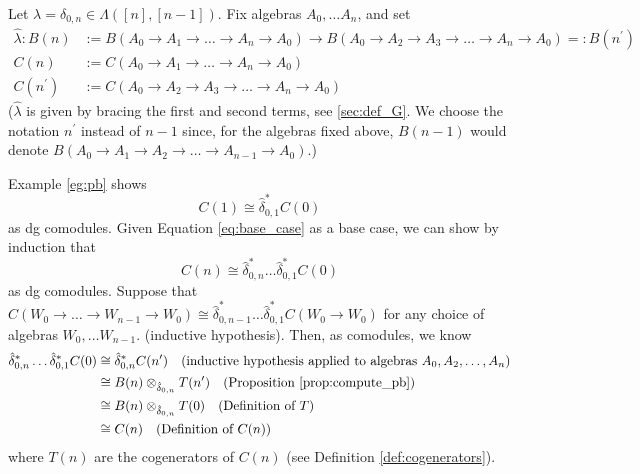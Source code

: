 %
\begin{eg} 
  \label{eg:pb2}
Let $\lambda = \delta_{0,n} \in 
\Lambda([n],[n-1])$. Fix algebras 
$A_0, \dots A_n$, and set
\begin{align*}
\hat{\lambda}: B(n)
&:= B(A_0 \to A_1 \to \dots \to A_n \to A_0) 
  \to B(A_0 \to A_2 \to A_3 \to \dots \to A_n \to A_0) 
  =: B(n^\prime)\\
C(n) 
&:= C(A_0 \to A_1 \to \dots \to A_n \to A_0)\\
C(n^\prime) 
&:= C(A_0 \to A_2 \to A_3 \to \dots \to A_n \to A_0)
\end{align*}
($\hat{\lambda}$ is given by bracing the 
first and second terms, see \ref{sec:def_G}. 
We choose the notation $n^\prime$ instead of $n-1$ 
since, for the algebras fixed above, 
$B(n-1)$ would denote 
$B(A_0 \to A_1 \to A_2 \to \dots \to A_{n-1} \to A_0)$.)

Example \ref{eg:pb} shows
\begin{equation} \label{eq:base_case}
C(1) \cong \hat{\delta}_{0,1}^*C(0)
\end{equation}
as dg comodules. Given Equation 
\ref{eq:base_case} as a base 
case, we can show by induction that 
$$
C(n) \cong \hat{\delta}_{0,n}^*\dots\hat{\delta}_{0,1}^*C(0)
$$ 
as dg comodules. Suppose that 
$C(W_0 \to \dots \to W_{n-1} \to W_0) 
\cong \hat{\delta}_{0,n-1}^* \dots \hat{\delta}_{0,1}^*
C(W_0 \to W_0)$ for any 
choice of algebras $W_0, \dots W_{n-1}$.
(inductive hypothesis). Then, as 
comodules, we know
\begin{align*}
\hat{\delta}_{0,n}^*\dots\hat{\delta}_{0,1}^*C(0)
& \cong
  \hat{\delta}_{0,n}^*C(n^\prime)
  \quad \textrm{(inductive hypothesis applied to algebras } 
  A_0, A_2,\dots,A_n)\\
& \cong 
  B(n) \otimes_{\hat{\delta}_{0,n}} T(n^\prime)
  \quad \textrm{(Proposition 
  \ref{prop:compute_pb})}\\
& \cong 
  B(n) \otimes_{\hat{\delta}_{0,n}} T(0)
  \quad \textrm{(Definition of $T$)} \\
& \cong 
  C(n)
  \quad \textrm{(Definition of $C(n)$)}
\end{align*}
where $T(n)$ are the cogenerators of 
$C(n)$ (see Definition 
\ref{def:cogenerators}).


\end{eg}
